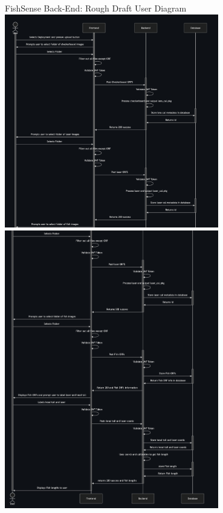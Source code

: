 \begin{frame}{FishSense Back-End: Rough Draft User Diagram}
    \centering
    \includegraphics[height=0.7\textheight,width=0.7\textwidth,keepaspectratio]{images/fishsense_enduser/backendimg1.png}
    \includegraphics[height=0.7\textheight,width=0.7\textwidth,keepaspectratio]{images/fishsense_enduser/backendimg2.png}
\end{frame}
